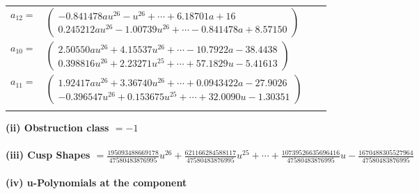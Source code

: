 \documentclass[1p]{elsarticle_modified}
\theoremstyle{definition}
\begin{document}
\begin{tabular}{m{7pt} m{180pt} m{7pt} m{180pt} }
\flushright $a_{12}=$&$\begin{pmatrix}-0.841478 a u^{26}-u^{26}+\cdots+6.18701 a+16\\0.245212 a u^{26}-1.00739 u^{26}+\cdots-0.841478 a+8.57150\end{pmatrix}$ \\
\flushright $a_{10}=$&$\begin{pmatrix}2.50550 a u^{26}+4.15537 u^{26}+\cdots-10.7922 a-38.4438\\0.398816 u^{26}+2.23271 u^{25}+\cdots+57.1829 u-5.41613\end{pmatrix}$ \\
\flushright $a_{11}=$&$\begin{pmatrix}1.92417 a u^{26}+3.36740 u^{26}+\cdots+0.0943422 a-27.9026\\-0.396547 u^{26}+0.153675 u^{25}+\cdots+32.0090 u-1.30351\end{pmatrix}$\\&\end{tabular}
\flushleft \textbf{(ii) Obstruction class $= -1$}\\~\\
\flushleft \textbf{(iii) Cusp Shapes $= \frac{195093488669178}{47580483876995} u^{26}+\frac{621166284588117}{47580483876995} u^{25}+\cdots+\frac{10739526635696416}{47580483876995} u-\frac{1670488305527964}{47580483876995}$}\\~\\
\newpage\renewcommand{\arraystretch}{1}
\flushleft \textbf{(iv) u-Polynomials at the component}\newline \\
\end{document}
